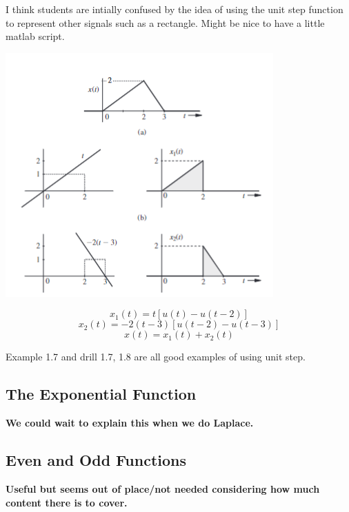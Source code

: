 \begin{example} 
    I think students are intially confused by the idea of using the unit step function to represent other signals such as a rectangle. Might be nice to have a little matlab script.

    \begin{center}
        \includegraphics{images/function_w_unitstep_1.7.png}
    \end{center}
    \[x_1(t) = t[u(t) - u(t-2)]\]
    \[x_2(t) = -2(t-3)[u(t-2)-u(t-3)]\]
    \[x(t) = x_1(t) + x_2(t)\]

    Example 1.7 and drill 1.7, 1.8 are all good examples of using unit step.
\end{example}

\subsection{The Exponential Function}
\textbf{We could wait to explain this when we do Laplace.}
\subsection{Even and Odd Functions}
\textbf{Useful but seems out of place/not needed considering how much content there is to cover.}

